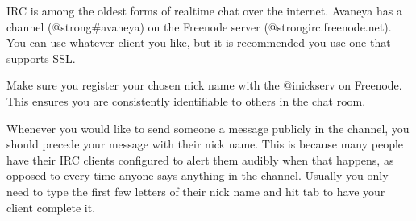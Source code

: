 IRC is among the oldest forms of realtime chat over the internet. Avaneya has a channel (@strong{#avaneya}) on the Freenode server (@strong{irc.freenode.net}). You can use whatever client you like, but it is recommended you use one that supports SSL.

Make sure you register your chosen nick name with the @i{nickserv} on Freenode. This ensures you are consistently identifiable to others in the chat room.

Whenever you would like to send someone a message publicly in the channel, you should precede your message with their nick name. This is because many people have their IRC clients configured to alert them audibly when that happens, as opposed to every time anyone says anything in the channel. Usually you only need to type the first few letters of their nick name and hit tab to have your client complete it.


